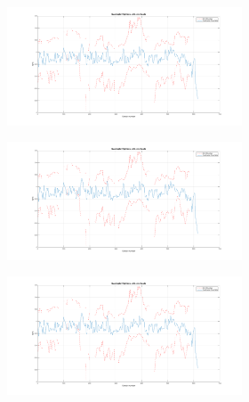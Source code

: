 \begin{figure}
  \centering
  \begin{subfigure}{0.48\textwidth}
    \begin{subfigure}{\textwidth}
      \includegraphics[clip, trim = 100 0 100 0, width = \textwidth]{figures/chapter5/x}
    \end{subfigure}
    \begin{subfigure}{\textwidth}
      \includegraphics[clip, trim = 100 0 100 0, width = \textwidth]{figures/chapter5/x}
    \end{subfigure}
    \begin{subfigure}{\textwidth}
      \includegraphics[clip, trim = 100 0 100 0, width = \textwidth]{figures/chapter5/x}

\end{subfigure}
\end{subfigure}
\end{figure}
